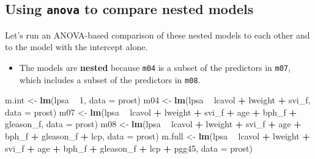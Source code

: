 \documentclass[]{book}
\newenvironment{Shaded}{\begin{snugshade}}{\end{snugshade}}
\newcommand{\KeywordTok}[1]{\textcolor[rgb]{0.13,0.29,0.53}{\textbf{#1}}}
\newcommand{\DataTypeTok}[1]{\textcolor[rgb]{0.13,0.29,0.53}{#1}}
\newcommand{\DecValTok}[1]{\textcolor[rgb]{0.00,0.00,0.81}{#1}}
\newcommand{\StringTok}[1]{\textcolor[rgb]{0.31,0.60,0.02}{#1}}
\newcommand{\OperatorTok}[1]{\textcolor[rgb]{0.81,0.36,0.00}{\textbf{#1}}}
\newcommand{\NormalTok}[1]{#1}
\providecommand{\tightlist}{%
  \setlength{\itemsep}{0pt}\setlength{\parskip}{0pt}}
\theoremstyle{definition}
\theoremstyle{definition}
\theoremstyle{definition}
\theoremstyle{remark}
\begin{document}
\subsection{\texorpdfstring{Using \texttt{anova} to compare nested
models}{Using anova to compare nested models}}\label{using-anova-to-compare-nested-models}

Let's run an ANOVA-based comparison of these nested models to each other
and to the model with the intercept alone.

\begin{itemize}
\tightlist
\item
  The models are \textbf{nested} because \texttt{m04} is a subset of the
  predictors in \texttt{m07}, which includes a subset of the predictors
  in \texttt{m08}.
\end{itemize}

\begin{Shaded}
\begin{Highlighting}[]
\NormalTok{m.int <-}\StringTok{ }\KeywordTok{lm}\NormalTok{(lpsa }\OperatorTok{~}\StringTok{ }\DecValTok{1}\NormalTok{, }\DataTypeTok{data =}\NormalTok{ prost)}
\NormalTok{m04 <-}\StringTok{ }\KeywordTok{lm}\NormalTok{(lpsa }\OperatorTok{~}\StringTok{ }\NormalTok{lcavol }\OperatorTok{+}\StringTok{ }\NormalTok{lweight }\OperatorTok{+}\StringTok{ }\NormalTok{svi_f, }\DataTypeTok{data =}\NormalTok{ prost)}
\NormalTok{m07 <-}\StringTok{ }\KeywordTok{lm}\NormalTok{(lpsa }\OperatorTok{~}\StringTok{ }\NormalTok{lcavol }\OperatorTok{+}\StringTok{ }\NormalTok{lweight }\OperatorTok{+}\StringTok{ }\NormalTok{svi_f }\OperatorTok{+}\StringTok{ }
\StringTok{              }\NormalTok{age }\OperatorTok{+}\StringTok{ }\NormalTok{bph_f }\OperatorTok{+}\StringTok{ }\NormalTok{gleason_f, }\DataTypeTok{data =}\NormalTok{ prost)}
\NormalTok{m08 <-}\StringTok{ }\KeywordTok{lm}\NormalTok{(lpsa }\OperatorTok{~}\StringTok{ }\NormalTok{lcavol }\OperatorTok{+}\StringTok{ }\NormalTok{lweight }\OperatorTok{+}\StringTok{ }\NormalTok{svi_f }\OperatorTok{+}\StringTok{ }
\StringTok{              }\NormalTok{age }\OperatorTok{+}\StringTok{ }\NormalTok{bph_f }\OperatorTok{+}\StringTok{ }\NormalTok{gleason_f }\OperatorTok{+}\StringTok{ }\NormalTok{lcp, }\DataTypeTok{data =}\NormalTok{ prost)}
\NormalTok{m.full <-}\StringTok{ }\KeywordTok{lm}\NormalTok{(lpsa }\OperatorTok{~}\StringTok{ }\NormalTok{lcavol }\OperatorTok{+}\StringTok{ }\NormalTok{lweight }\OperatorTok{+}\StringTok{ }\NormalTok{svi_f }\OperatorTok{+}\StringTok{ }
\StringTok{              }\NormalTok{age }\OperatorTok{+}\StringTok{ }\NormalTok{bph_f }\OperatorTok{+}\StringTok{ }\NormalTok{gleason_f }\OperatorTok{+}\StringTok{ }\NormalTok{lcp }\OperatorTok{+}\StringTok{ }\NormalTok{pgg45, }\DataTypeTok{data =}\NormalTok{ prost)}
\end{Highlighting}
\end{Shaded}
\end{document}
